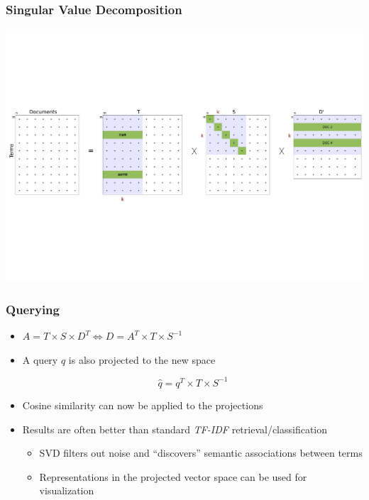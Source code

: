 \documentclass{beamer}
\begin{document}

\begin{frame}
  \frametitle{Singular Value Decomposition}

  \centering
  \includegraphics[width=\linewidth]{svd}

\end{frame}


\begin{frame}
  \frametitle{Querying}

  \begin{itemize}
  \item $A = T \times S \times D^T \Leftrightarrow D = A^T \times T \times S^{-1}$
  \item A query $q$ is also projected to the new space
    \begin{block}{}
      \begin{displaymath}
        \hat{q} = q^T \times T \times S^{-1}
      \end{displaymath}
    \end{block}
  \item Cosine similarity can now be applied to the projections
  \item Results are often better than standard \textit{TF-IDF} retrieval/classification
    \begin{itemize}
    \item SVD filters out noise and ``discovers'' semantic associations between terms
    \item Representations in the projected vector space can be used for visualization
    \end{itemize}
  \end{itemize}

\end{frame}
\end{document}
